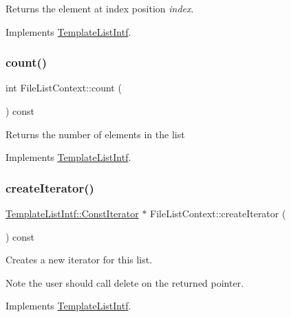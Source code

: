 Returns the element at index position {\itshape index}. 

Implements \mbox{\hyperlink{class_template_list_intf_aa51e57e72eacf4e8ce1055ee30a0f7f8}{Template\+List\+Intf}}.

\mbox{\label{class_file_list_context_a0394f04efdefc36ab71bc5608db94644}} 
\subsubsection{\texorpdfstring{count()}{count()}}
{\footnotesize\ttfamily int File\+List\+Context\+::count (\begin{DoxyParamCaption}{ }\end{DoxyParamCaption}) const\hspace{0.3cm}{\ttfamily [virtual]}}

Returns the number of elements in the list 

Implements \mbox{\hyperlink{class_template_list_intf_a329e49e33484c2aa5106aac1bf4e5216}{Template\+List\+Intf}}.

\mbox{\label{class_file_list_context_a242d626e27147b2f7a07bc2c27417a4f}} 
\subsubsection{\texorpdfstring{createIterator()}{createIterator()}}
{\footnotesize\ttfamily \mbox{\hyperlink{class_template_list_intf_1_1_const_iterator}{Template\+List\+Intf\+::\+Const\+Iterator}} $\ast$ File\+List\+Context\+::create\+Iterator (\begin{DoxyParamCaption}{ }\end{DoxyParamCaption}) const\hspace{0.3cm}{\ttfamily [virtual]}}

Creates a new iterator for this list. \begin{DoxyNote}{Note}
the user should call delete on the returned pointer. 
\end{DoxyNote}


Implements \mbox{\hyperlink{class_template_list_intf_a56b82384db24c3e121076a1da046d378}{Template\+List\+Intf}}.

